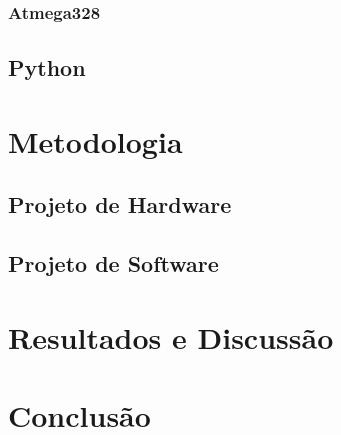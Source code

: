 	
	

\subsection{Atmega328}

\section{Python}

\chapter[Metodologia]{Metodologia}

\section{Projeto de Hardware}

\section {Projeto de Software}

\chapter{Resultados e Discussão}

\chapter{Conclusão}